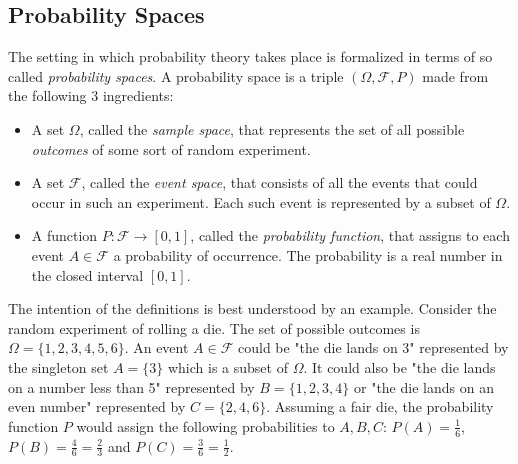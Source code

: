 \subsection{Probability Spaces}
The setting in which probability theory takes place is formalized in terms of so called \emph{probability spaces}. A probability space is a triple $(\Omega, \mathcal{F}, P)$ made from the following 3 ingredients: 

\begin{itemize}

\item 
A set $\Omega$, called the \emph{sample space}, that represents the set of all possible \emph{outcomes} of some sort of random experiment.

\item
A set $\mathcal{F}$, called the \emph{event space}, that consists of all the events that could occur in such an experiment. Each such event is represented by a subset of $\Omega$.

\item 
A function $P: \mathcal{F} \rightarrow [0,1]$, called the \emph{probability function}, that assigns to each event $A \in \mathcal{F}$ a probability of occurrence. The probability is a real number in the closed interval $[0,1]$.

\end{itemize}


The intention of the definitions is best understood by an example. Consider the random experiment of rolling a die. The set of possible outcomes is $\Omega = \{1,2,3,4,5,6\}$. An event $A \in \mathcal{F}$ could be "the die lands on 3" represented by the singleton set $A = \{3\}$ which is a subset of $\Omega$. It could also be "the die lands on a number less than 5" represented by $B = \{1,2,3,4\}$ or "the die lands on an even number" represented by $C = \{2,4,6\}$. Assuming a fair die, the probability function $P$ would assign the following probabilities to $A,B,C$: $P(A) = \frac{1}{6}$, $P(B) = \frac{4}{6} = \frac{2}{3}$ and  $P(C) = \frac{3}{6} = \frac{1}{2}$.


